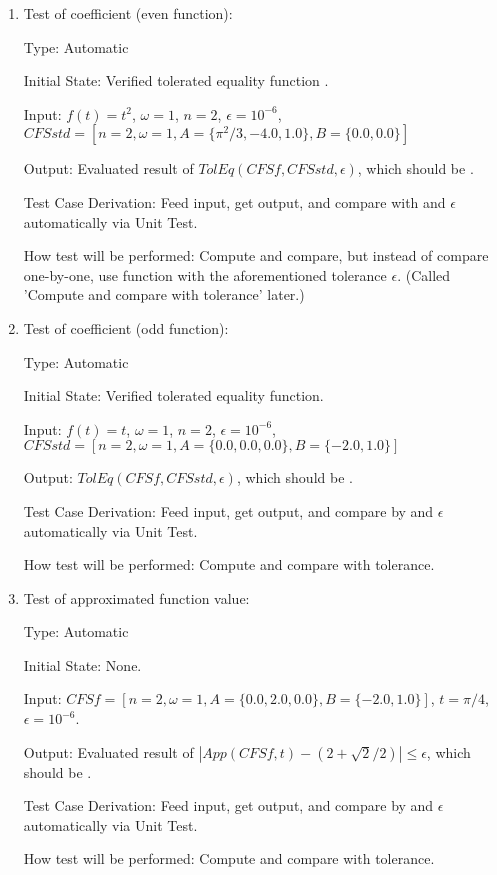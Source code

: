 \documentclass[12pt, titlepage]{article}
\begin{document}
\begin{enumerate}
	\item{Test of coefficient (even function):\\}
	
	Type: Automatic
	
	Initial State: Verified tolerated equality function .
	
	Input: $f(t)=t^2$, $\omega=1$, $n=2$, $\epsilon=10^{-6}$,
        $\mathit{CFSstd}=[n=2,\omega=1, A=\{\pi^2/3, -4.0, 1.0\}, B=\{0.0,
        0.0\}]$
	
	Output: Evaluated result of
        $\mathit{TolEq}(\mathit{CFSf}, \mathit{CFSstd}, \epsilon)$, which should
        be . 
	
	Test Case Derivation: Feed input, get output, and compare with  and $\epsilon$ automatically via Unit Test.
	
	How test will be performed: Compute and compare, but instead of compare one-by-one, use  function with the aforementioned tolerance $\epsilon$. (Called 'Compute and compare with tolerance' later.)
	
	\item{Test of coefficient (odd function):\\}
	
	Type: Automatic	
	
	Initial State: Verified tolerated equality function.
	
	Input: $f(t)=t$, $\omega=1$, $n=2$, $\epsilon=10^{-6}$,
        $\mathit{CFSstd}=[n=2,\omega=1, A=\{0.0, 0.0, 0.0\}, B=\{-2.0, 1.0\}]$
	
	Output: $\mathit{TolEq}(\mathit{CFSf}, \mathit{CFSstd}, \epsilon)$,
        which should be .
	
	Test Case Derivation: Feed input, get output, and compare by  and $\epsilon$ automatically via Unit Test.
	
	
	How test will be performed: Compute and compare with tolerance.
	
	\item{Test of approximated function value: \\}
	
	Type: Automatic
	
	Initial State: None.
	
	Input: $\mathit{CFSf}=[n=2,\omega=1, A=\{0.0, 2.0, 0.0\}, B=\{-2.0,
        1.0\}]$, $t=\pi/4$, $\epsilon=10^{-6}$.
	
	Output: Evaluated result of
        $|\mathit{App}(\mathit{CFSf}, t)-(2+\sqrt{2}/2)|\leq\epsilon$, which
        should be .
	
	Test Case Derivation: Feed input, get output, and compare by  and $\epsilon$ automatically via Unit Test.
	
	
	How test will be performed: Compute and compare with tolerance.
	
\end{enumerate}
\end{document}
